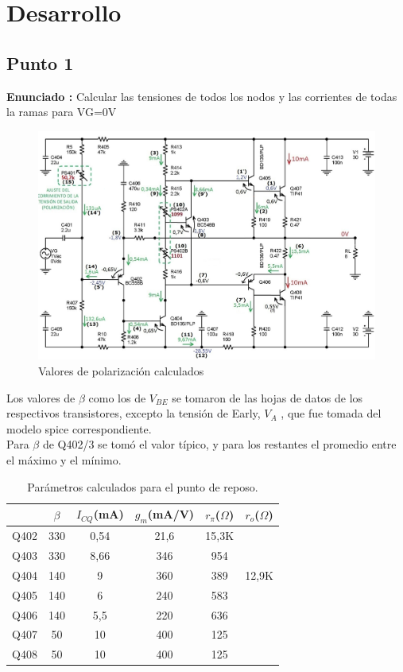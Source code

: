 \documentclass[12pt]{book}
\begin{document}
\newpage
\section{Desarrollo}
\subsection{Punto 1}
\textbf{Enunciado : } Calcular las tensiones de todos los nodos y las corrientes de todas la ramas para VG=0V\\[1cm]
\begin{figure}[H]
\centering
\includegraphics[scale=0.4]{figuras/1-valoresReposo.png}
\caption{Valores de polarización calculados}
\label{figura1}
\end{figure}
Los valores de $\beta$ como los de $V_{BE}$ se tomaron de las hojas de datos de los respectivos transistores, excepto la tensión de Early, $V_{A}$ , que fue tomada del modelo spice correspondiente.\\
Para $\beta$ de Q402/3 se tomó el valor típico, y para los restantes el promedio entre el máximo y el mínimo.\\

\begin{table}[H]
\centering
\begin{tabular}{|l|c|c|c|c|c|}
\hline
&$\beta$&$I_{CQ}$(mA)&$g_{m}$(mA/V)&$r_{\pi}$($\Omega$)&$r_{o}$($\Omega$)\\
\hline
Q402&330&0,54&21,6&15,3K&\\
\hline
Q403&330&8,66&346&954&\\
\hline
Q404&140&9&360&389&12,9K\\
\hline
Q405&140&6&240&583&\\
\hline
Q406&140&5,5&220&636&\\
\hline
Q407&50&10&400&125&\\
\hline
Q408&50&10&400&125&\\
\hline
\end{tabular}
\caption{Parámetros calculados para el punto de reposo.}
\label{Polarizacion}
\end{table}
\end{document}

